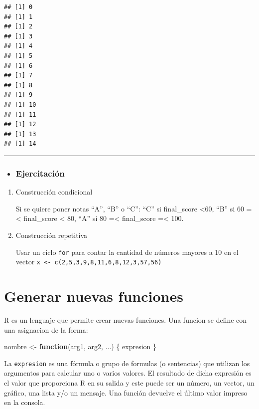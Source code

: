 \documentclass[]{book}
\newenvironment{Shaded}{\begin{snugshade}}{\end{snugshade}}
\newcommand{\StringTok}[1]{\textcolor[rgb]{0.31,0.60,0.02}{#1}}
\newcommand{\ControlFlowTok}[1]{\textcolor[rgb]{0.13,0.29,0.53}{\textbf{#1}}}
\newcommand{\NormalTok}[1]{#1}
\newenvironment{rmdblock}[1]
{\begin{shaded*}
		\begin{itemize}
			\renewcommand{\labelitemi}{
				\raisebox{-.7\height}[0pt][0pt]{
					{\setkeys{Gin}{width=3em,keepaspectratio}\texttt{[image: images/\#1]}}
				}
			}
			\item
		}
		{
		\end{itemize}
	\end{shaded*}
}
\newenvironment{rmdtip}
{\begin{rmdblock}{tip}}
	{\end{rmdblock}}
\begin{document}
\begin{verbatim}
## [1] 0
## [1] 1
## [1] 2
## [1] 3
## [1] 4
## [1] 5
## [1] 6
## [1] 7
## [1] 8
## [1] 9
## [1] 10
## [1] 11
## [1] 12
## [1] 13
## [1] 14
\end{verbatim}

\begin{center}\rule{0.5\linewidth}{\linethickness}\end{center}

\begin{rmdtip}
\hypertarget{ejercitacion}{%
\subsection{Ejercitación}\label{ejercitacion}}
\end{rmdtip}

\begin{boxeda}
\begin{enumerate}
\def\labelenumi{\arabic{enumi}.}
\item
  Construcción condicional

  Si se quiere poner notas ``A'', ``B'' o ``C'': ``C'' si final\_score
  \textless{}60, ``B'' si 60 =\textless{} final\_score \textless{} 80,
  ``A'' si 80 =\textless{} final\_score =\textless{} 100.
\item
  Construcción repetitiva

  Usar un ciclo \texttt{for} para contar la cantidad de números mayores
  a 10 en el vector
  \texttt{x\ \textless{}-\ c(2,5,3,9,8,11,6,8,12,3,57,56)}
\end{enumerate}
\end{boxeda}

\hypertarget{generar-nuevas-funciones}{%
\chapter{Generar nuevas funciones}\label{generar-nuevas-funciones}}

R es un lenguaje que permite crear nuevas funciones. Una funcion se
define con una asignacion de la forma:

\begin{Shaded}
\begin{Highlighting}[]
\NormalTok{nombre <-}\StringTok{ }\ControlFlowTok{function}\NormalTok{(arg1, arg2, ...) \{}
\NormalTok{   expresion}
\NormalTok{ \}}
\end{Highlighting}
\end{Shaded}

La \texttt{expresion} es una fórmula o grupo de formulas (o sentencias)
que utilizan los argumentos para calcular uno o varios valores. El
resultado de dicha expresión es el valor que proporciona R en su salida
y este puede ser un número, un vector, un gráfico, una lista y/o un
mensaje. Una función devuelve el último valor impreso en la consola.
\end{document}
